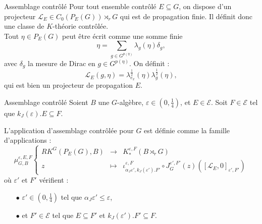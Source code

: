 \begin{frame}{Assemblage contrôlé}
Pour tout ensemble contrôlé $E\subseteq G$, on dispose d'un projecteur $\mathcal L_E\in C_0(P_E(G))\rtimes_r G$ qui est de propagation finie. Il définit donc une classe de $K$-théorie contrôlée.\\
\vspace{0.3 cm}
Tout $\eta\in P_E(G)$ peut être écrit comme une somme finie 
\[\eta = \sum_{g\in G^{p(\eta)}}\lambda_g(\eta)\delta_g,\]
avec $\delta_g$ la mesure de Dirac en $g\in G^{p(\eta)}$. On définit :
\[\mathcal L_E(g,\eta) = \lambda_{e_x}^{\frac{1}{2}}(\eta)\lambda_g^{\frac{1}{2}}(\eta),\] 
qui est bien un projecteur  de propagation $E$.
\end{frame}

\begin{frame}{Assemblage contrôlé}
Soient $B$ une $G$-algèbre, $\varepsilon\in (0,\frac{1}{4})$, et $E\in\mathcal E$. Soit $F\in \mathcal E$ tel que $k_J(\varepsilon).E \subseteq F$. 
\begin{definitionfr}
L'application d'assemblage contrôlée pour $G$ est définie comme la famille d'applications :
\[\mu_{G,B}^{\varepsilon,E,F}\left\{
\begin{array}{rcl}
RK^G(P_E(G), B) & \rightarrow & K_*^{\varepsilon, F}(B\rtimes_r G)\\
z & \mapsto & \iota_{\alpha_J\varepsilon', k_J(\varepsilon').F'}^{\varepsilon,F} \circ J_G^{\varepsilon', F'}(z)([\mathcal L_E,0]_{\varepsilon' , F'})
\end{array}\right.\]
où $\varepsilon'$ et $F'$ vérifient :
\begin{itemize}
\item[$\bullet$] $\varepsilon'\in (0,\frac{1}{4})$ tel que $\alpha_J \varepsilon'\leq \varepsilon$,
\item[$\bullet$] et $F'\in\mathcal E$ tel que $E\subseteq F'$ et $k_J(\varepsilon').F'\subseteq F$.
\end{itemize}
\end{definitionfr}
\end{frame}

